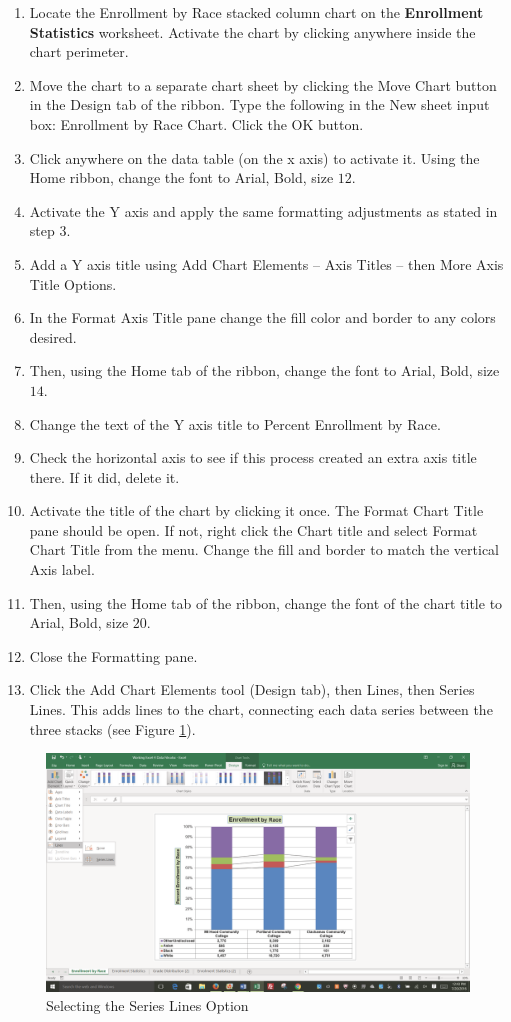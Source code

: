 \begin{enumerate}
	\item Locate the Enrollment by Race stacked column chart on the \textbf{Enrollment Statistics} worksheet. Activate the chart by clicking anywhere inside the chart perimeter.
	\item Move the chart to a separate chart sheet by clicking the Move Chart button in the Design tab of the ribbon. Type the following in the New sheet input box: Enrollment by Race Chart. Click the OK button.
	\item Click anywhere on the data table (on the x axis) to activate it. Using the Home ribbon, change the font to Arial, Bold, size $ 12 $.
	\item Activate the Y axis and apply the same formatting adjustments as stated in step $ 3 $. 
	\item Add a Y axis title using Add Chart Elements – Axis Titles – then More Axis Title Options.
	\item In the Format Axis Title pane change the fill color and border to any colors desired.
	\item Then, using the Home tab of the ribbon, change the font to Arial, Bold, size $ 14 $.
	\item Change the text of the Y axis title to Percent Enrollment by Race.
	\item Check the horizontal axis to see if this process created an extra axis title there. If it did, delete it.
	\item Activate the title of the chart by clicking it once. The Format Chart Title pane should be open. If not, right click the Chart title and select Format Chart Title from the menu. Change the fill and border to match the vertical Axis label.
	\item Then, using the Home tab of the ribbon, change the font of the chart title to Arial, Bold, size $ 20 $.
	\item Close the Formatting pane.
	\item Click the Add Chart Elements tool (Design tab), then Lines, then Series Lines. This adds lines to the chart, connecting each data series between the three stacks (see Figure \ref{04:fig39}).
\end{enumerate}

\begin{figure}[H]
	\centering
	\includegraphics[width=\maxwidth{.95\linewidth}]{gfx/ch04_fig39}
	\caption{Selecting the Series Lines Option}
	\label{04:fig39}
\end{figure}

